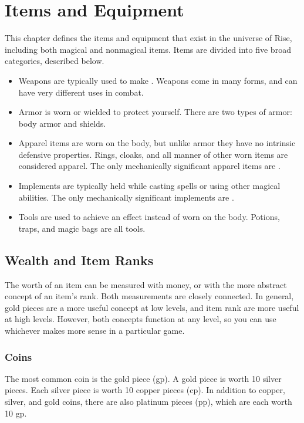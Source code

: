 \chapter{Items and Equipment}

This chapter defines the items and equipment that exist in the universe of Rise, including both magical and nonmagical items.
Items are divided into five broad categories, described below.
\begin{itemize}
  \item Weapons are typically used to make .
    Weapons come in many forms, and can have very different uses in combat.
  \item Armor is worn or wielded to protect yourself.
    There are two types of armor: body armor and shields.
  \item Apparel items are worn on the body, but unlike armor they have no intrinsic defensive properties.
    Rings, cloaks, and all manner of other worn items are considered apparel.
    The only mechanically significant apparel items are \magical.
  \item Implements are typically held while casting spells or using other magical abilities.
    The only mechanically significant implements are \magical.
  \item Tools are used to achieve an effect instead of worn on the body.
    Potions, traps, and magic bags are all tools.
\end{itemize}

\section{Wealth and Item Ranks}\label{Wealth}\label{Wealth and Item Ranks}

  The worth of an item can be measured with money, or with the more abstract concept of an item's rank.
  Both measurements are closely connected.
  In general, gold pieces are a more useful concept at low levels, and item rank are more useful at high levels.
  However, both concepts function at any level, so you can use whichever makes more sense in a particular game.

  \subsection{Coins}
    The most common coin is the gold piece (gp). A gold piece is worth 10 silver pieces. Each silver piece is worth 10 copper pieces (cp). In addition to copper, silver, and gold coins, there are also platinum pieces (pp), which are each worth 10 gp.

